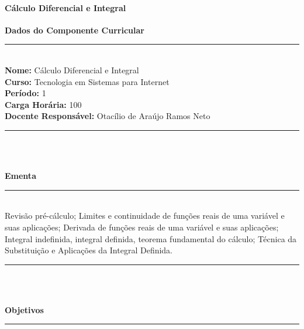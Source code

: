 \paragraph{Cálculo Diferencial e Integral}

\begin{center}\textbf{Dados do Componente Curricular}\end{center}
\vspace{-5mm}
\noindent\rule{16.5cm}{0.4pt}
\\
\textbf{Nome:} Cálculo Diferencial e Integral
\\ 
\textbf{Curso:} Tecnologia em Sistemas para Internet
\\ 
\textbf{Período:} \unit{1}{\degree}
\\ 
\textbf{Carga Horária:} \unit{100}{\hour}
\\ 
\textbf{Docente Responsável:} Otacílio de Araújo Ramos Neto
\\ 
\noindent\rule{16.5cm}{0.4pt}\\
\\
\vspace{-12mm}
\begin{center}\textbf{Ementa}\end{center}
\vspace{-5mm}
\noindent\rule{16.5cm}{0.4pt}
\\
Revisão pré-cálculo; Limites e continuidade de funções reais de uma variável e suas aplicações; Derivada de funções reais de uma variável e suas aplicações; Integral indefinida, integral definida, teorema fundamental do cálculo; Técnica da Substituição e Aplicações da Integral Definida.\\ 
\noindent\rule{16.5cm}{0.4pt}\\
\\
\vspace{-12mm}
\begin{center}\textbf{Objetivos}\end{center}
\vspace{-5mm}
\noindent\rule{16.5cm}{0.4pt}
\\
